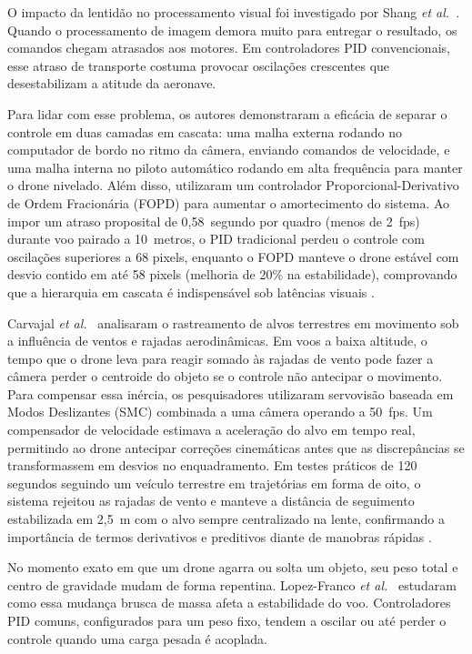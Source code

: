 O impacto da lentidão no processamento visual foi investigado por Shang \textit{et al.}~\cite{shang2016}. Quando o processamento de imagem demora muito para entregar o resultado, os comandos chegam atrasados aos motores. Em controladores PID convencionais, esse atraso de transporte costuma provocar oscilações crescentes que desestabilizam a atitude da aeronave.

Para lidar com esse problema, os autores demonstraram a eficácia de separar o controle em duas camadas em cascata: uma malha externa rodando no computador de bordo no ritmo da câmera, enviando comandos de velocidade, e uma malha interna no piloto automático rodando em alta frequência para manter o drone nivelado. Além disso, utilizaram um controlador Proporcional-Derivativo de Ordem Fracionária (FOPD) para aumentar o amortecimento do sistema. Ao impor um atraso proposital de 0,58~segundo por quadro (menos de 2~fps) durante voo pairado a 10~metros, o PID tradicional perdeu o controle com oscilações superiores a 68 pixels, enquanto o FOPD manteve o drone estável com desvio contido em até 58 pixels (melhoria de 20\% na estabilidade), comprovando que a hierarquia em cascata é indispensável sob latências visuais \cite{shang2016}.

Carvajal \textit{et al.}~\cite{carvajal2024} analisaram o rastreamento de alvos terrestres em movimento sob a influência de ventos e rajadas aerodinâmicas. Em voos a baixa altitude, o tempo que o drone leva para reagir somado às rajadas de vento pode fazer a câmera perder o centroide do objeto se o controle não antecipar o movimento. Para compensar essa inércia, os pesquisadores utilizaram servovisão baseada em Modos Deslizantes (SMC) combinada a uma câmera operando a 50~fps. Um compensador de velocidade estimava a aceleração do alvo em tempo real, permitindo ao drone antecipar correções cinemáticas antes que as discrepâncias se transformassem em desvios no enquadramento. Em testes práticos de 120 segundos seguindo um veículo terrestre em trajetórias em forma de oito, o sistema rejeitou as rajadas de vento e manteve a distância de seguimento estabilizada em 2,5~m com o alvo sempre centralizado na lente, confirmando a importância de termos derivativos e preditivos diante de manobras rápidas \cite{carvajal2024}.

No momento exato em que um drone agarra ou solta um objeto, seu peso total e centro de gravidade mudam de forma repentina. Lopez-Franco \textit{et al.}~\cite{lopezfranco2017} estudaram como essa mudança brusca de massa afeta a estabilidade do voo. Controladores PID comuns, configurados para um peso fixo, tendem a oscilar ou até perder o controle quando uma carga pesada é acoplada.

